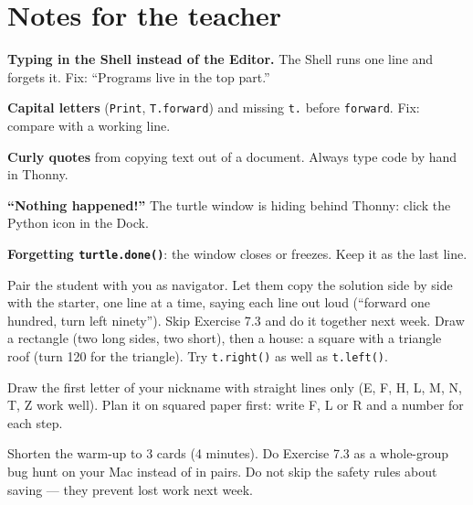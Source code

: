 \section{Notes for the teacher}
\begin{commonmistakes}
  \item \textbf{Typing in the Shell instead of the Editor.} The Shell runs one line and forgets it. Fix: \enquote{Programs live in the top part.}
  \item \textbf{Capital letters} (\texttt{Print}, \texttt{T.forward}) and missing \texttt{t.} before \texttt{forward}. Fix: compare with a working line.
  \item \textbf{Curly quotes} from copying text out of a document. Always type code by hand in Thonny.
  \item \textbf{\enquote{Nothing happened!}} The turtle window is hiding behind Thonny: click the Python icon in the Dock.
  \item \textbf{Forgetting \texttt{turtle.done()}}: the window closes or freezes. Keep it as the last line.
\end{commonmistakes}
\begin{differentiation}
\supportpath Pair the student with you as navigator. Let them copy the solution side by side with the starter, one line at a time, saying each line out loud (\enquote{forward one hundred, turn left ninety}). Skip Exercise 7.3 and do it together next week.
\extensionpath Draw a rectangle (two long sides, two short), then a house: a square with a triangle roof (turn 120 for the triangle). Try \texttt{t.right()} as well as \texttt{t.left()}.
\end{differentiation}
\begin{stretchchallenge}
Draw the first letter of your nickname with straight lines only (E, F, H, L, M, N, T, Z work well). Plan it on squared paper first: write F, L or R and a number for each step.
\end{stretchchallenge}
\begin{teachernote}
Shorten the warm-up to 3 cards (4 minutes). Do Exercise 7.3 as a whole-group bug hunt on your Mac instead of in pairs. Do not skip the safety rules about saving --- they prevent lost work next week.
\end{teachernote}
